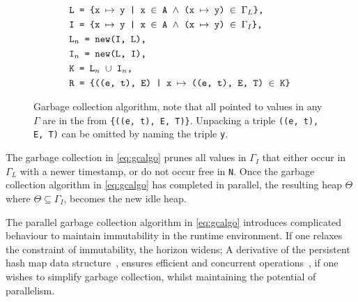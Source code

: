 \begin{figure}
\begin{mdframed}[style=bigbox]
\begin{align}
			&\hspace{0.62cm}\texttt{L = \{x $\mapsto$ y | x $\in$ A $\land$ (x $\mapsto$ y) $\in$ $\Gamma_L$\},} \tag*{}                                                                                \\
			&\hspace{0.62cm}\texttt{I = \{x $\mapsto$ y | x $\in$ A $\land$ (x $\mapsto$ y) $\in$ $\Gamma_I$\},} \tag*{}                                                                                \\
			&\hspace{0.62cm}\texttt{L$_n$ = new(I, L),}\tag*{}                                                                                                                                          \\
			&\hspace{0.62cm}\texttt{I$_n$ = new(L, I),}\tag*{}                                                                                                                                          \\
			&\hspace{0.62cm}\texttt{K = L$_n$ $\cup$ I$_n$,}\tag*{}                                                                                                                                     \\
			&\hspace{0.62cm}\texttt{R = \{((e, t), E) | x $\mapsto$ ((e, t), E, T) $\in$ K\}} \tag*{}
		\end{align}
	\end{mdframed}
	\caption{Garbage collection algorithm, note that all pointed to values in any $\Gamma$ are in the from \texttt{\{((e, t), E, T)\}}. Unpacking a triple \texttt{((e, t), E, T)} can be omitted by naming the triple \texttt{y}.}
	\label{eq:gcalgo}
\end{figure}
The garbage collection in \autoref{eq:gcalgo} prunes all values in $\Gamma_I$ that either occur in $\Gamma_L$ with a newer timestamp, or do not occur free in \texttt{N}.
Once the garbage collection algorithm in \autoref{eq:gcalgo} has completed in parallel, the resulting heap $\Theta$ where $\Theta \subseteq \Gamma_I$, becomes the new idle heap.
\begin{remark}
	The parallel garbage collection algorithm in \autoref{eq:gcalgo} introduces complicated behaviour to maintain immutability in the runtime environment.
	If one relaxes the constraint of immutability, the horizon widens;
	A derivative of the persistent hash map data structure~\cite{bagwell2001ideal}, ensures efficient and concurrent operations~\cite{prokopec2012concurrent}, if one wishes to simplify garbage collection, whilst maintaining the potential of parallelism.
\end{remark}

